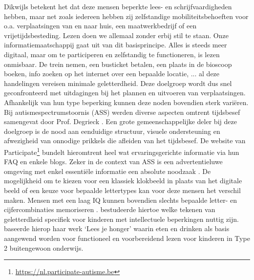 Dikwijls betekent het dat deze mensen beperkte lees- en schrijfvaardigheden hebben, maar net zoals iedereen hebben zij zelfstandige mobiliteitsbehoeften voor o.a. verplaatsingen van en naar huis, een maatwerkbedrijf of een vrijetijdsbesteding. Lezen doen we allemaal zonder erbij stil te staan. Onze informatiemaatschappij gaat uit van dit basisprincipe. Alles is steeds meer digitaal, maar om te participeren en zelfstandig te functioneren, is lezen onmisbaar. De trein nemen, een busticket betalen, een plaats in de bioscoop boeken, info zoeken op het internet over een bepaalde locatie, ... al deze handelingen vereisen minimale geletterdheid.
Deze doelgroep wordt dus snel geconfronteerd met uitdagingen bij het plannen en uitvoeren van verplaatsingen. Afhankelijk van hun type beperking kunnen deze noden bovendien sterk variëren. Bij autismespectrumstoornis (ASS) werden diverse aspecten omtrent tijdsbesef samengevat door Prof. Degrieck \autocite{Degrieck2014}. Een grote gemeenschappelijke deler bij deze doelgroep is de nood aan eenduidige structuur, visuele ondersteuning en afwezigheid van onnodige prikkels die afleiden van het tijdsbesef. De website van Participate\footnote{\url{https://nl.participate-autisme.be}} bundelt hieromtrent heel wat ervaringsgerichte informatie via hun FAQ en enkele blogs. Zeker in de context van ASS is een advertentieluwe omgeving met enkel essentiële informatie een absolute noodzaak \autocite{Roeyers2014}. De mogelijkheid om te kiezen voor een klassiek klokbeeld in plaats van het digitale beeld of een keuze voor bepaalde lettertypes kan voor deze mensen het verschil maken. Mensen met een laag IQ kunnen bovendien slechts bepaalde letter- en cijfercombinaties memoriseren \autocite{DeGraaf2001, Tytgat2014}. \textcite{Tilborg2018} bestudeerde hiertoe welke tekenen van geletterdheid specifiek voor kinderen met intellectuele beperkingen nuttig zijn. \textcite{Uyttersprot2021} baseerde hierop haar werk ‘Lees je honger’ waarin eten en drinken als basis aangewend worden voor functioneel en voorbereidend lezen voor kinderen in Type 2 buitengewoon onderwijs. 
